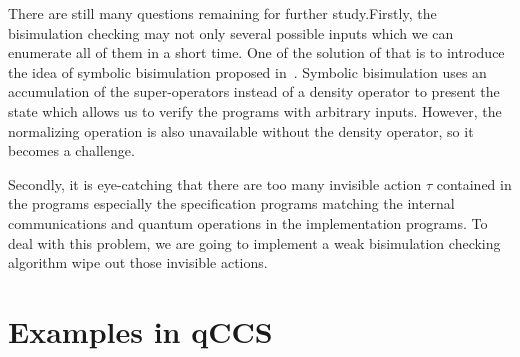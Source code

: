 \documentclass[a4paper,UKenglish,cleveref, autoref]{lipics-v2019}
\begin{document}
There are still many questions remaining for further study.Firstly, the bisimulation checking may not only several possible inputs which we can enumerate all of them in a short time. One of the solution of that is to introduce the idea of symbolic bisimulation proposed in~\cite{FDY14}. Symbolic bisimulation uses an accumulation of the super-operators instead of a density operator to present the state which allows us to verify the programs with arbitrary inputs. However, the normalizing operation is also unavailable without the density operator, so it becomes a challenge.

Secondly, it is eye-catching that there are too many invisible action $\tau$ contained in the programs especially the specification programs matching the internal communications and quantum operations in the implementation programs. To deal with this problem, we are going to implement a weak bisimulation checking algorithm wipe out those invisible actions. 



%


\appendix

\section{Examples in qCCS}
\label{sec:examples}
\end{document}
